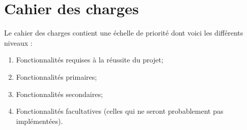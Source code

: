 \section{Cahier des charges}
Le cahier des charges contient une échelle de priorité dont voici les différents niveaux :
%
\begin{enumerate}
	\item Fonctionnalités requises à la réussite du projet;
	\item Fonctionnalités primaires;
	\item Fonctionnalités secondaires;
	\item Fonctionnalités facultatives (celles qui ne seront probablement pas implémentées).
\end{enumerate}








